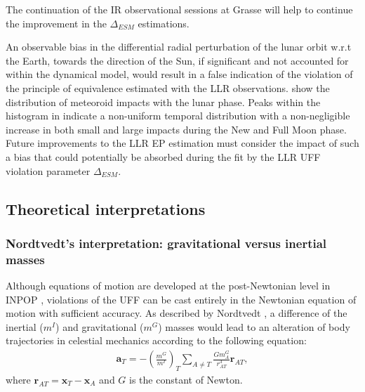\documentclass[fleqn,usenatbib,referee]{mnras}
\begin{document}
The continuation of the IR observational sessions at Grasse will help to continue the improvement in the $\Delta_{ESM}$ estimations.

An observable bias in the differential radial perturbation of the lunar orbit w.r.t the Earth, towards the direction of the Sun, if significant and not accounted for within the dynamical model, would result in a false indication of the violation of the principle of equivalence estimated with the LLR observations. \cite{Oberst2012} show the distribution of meteoroid impacts with the lunar phase. Peaks within the histogram in \citet[p~186]{Oberst2012} indicate a non-uniform temporal distribution with a non-negligible increase in both small and large impacts during the New and Full Moon phase. Future improvements to the LLR EP estimation must consider the impact of such a bias that could potentially be absorbed during the fit by the LLR UFF violation parameter $\Delta_{ESM}$.

\subsection{Theoretical interpretations}
\label{thiner}

\subsubsection{Nordtvedt's interpretation: gravitational versus inertial masses}
\label{classic}
Although equations of motion are developed at the post-Newtonian level in INPOP \cite[]{Moyer2003}, violations of the UFF can be cast entirely in the Newtonian equation of motion with sufficient accuracy. As described by Nordtvedt \cite[]{1968PhRv..170.1186N}, a difference of the inertial ($m^I$) and gravitational ($m^G$) masses would lead to an alteration of body trajectories in celestial mechanics according to the following equation:
\begin{eqnarray}
\bm {a}_T=-\left(\frac{m^G}{m^I} \right)_T \sum_{A\neq T} \frac{G m^G_A}{r_{AT}^3}\bm r_{AT} \label{eq:nordt_motion},
\end{eqnarray}
where $\bm r_{AT}= \bm x_T - \bm x_A$ and $G$ is the constant of Newton.
\end{document}
